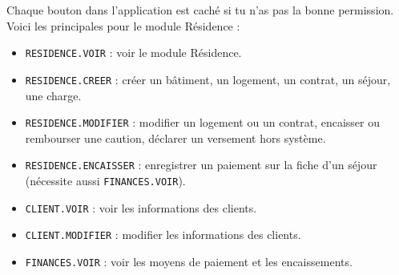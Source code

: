 \documentclass[12pt,a4paper]{article}
\begin{document}
Chaque bouton dans l'application est caché si tu n'as pas la bonne permission. Voici les principales pour le module Résidence :

\begin{itemize}[label=\textcolor{lagoon}{\faKey}]
  \item \texttt{RESIDENCE.VOIR} : voir le module Résidence.
  \item \texttt{RESIDENCE.CREER} : créer un bâtiment, un logement, un contrat, un séjour, une charge.
  \item \texttt{RESIDENCE.MODIFIER} : modifier un logement ou un contrat, encaisser ou rembourser une caution, déclarer un versement hors système.
  \item \texttt{RESIDENCE.ENCAISSER} : enregistrer un paiement sur la fiche d'un séjour (nécessite aussi \texttt{FINANCES.VOIR}).
  \item \texttt{CLIENT.VOIR} : voir les informations des clients.
  \item \texttt{CLIENT.MODIFIER} : modifier les informations des clients.
  \item \texttt{FINANCES.VOIR} : voir les moyens de paiement et les encaissements.
\end{itemize}

\vfill

\begin{center}
\end{center}
\end{document}
